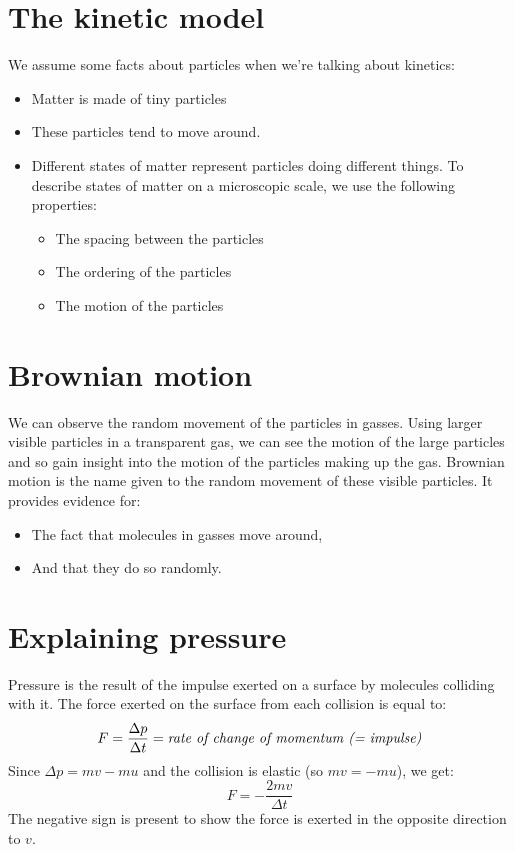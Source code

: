 \documentclass{article}
\begin{document}
\section*{The kinetic model}
\thispagestyle{empty}
We assume some facts about particles when we're talking about kinetics:
\begin{itemize}
	\item Matter is made of tiny particles
	\item These particles tend to move around.
	\item Different states of matter represent particles doing different things.
	To describe states of matter on a microscopic scale, we use the following
	properties:
		\begin{itemize}
			\item The spacing between the particles
			\item The ordering of the particles
			\item The motion of the particles
		\end{itemize}
\end{itemize}

\section*{Brownian motion}
We can observe the random movement of the particles in gasses. Using larger
visible particles in a transparent gas, we can see the motion of the large
particles and so gain insight into the motion of the particles making up the
gas. Brownian motion is the name given to the random movement of these visible
particles. It provides evidence for:
\begin{itemize}
	\item The fact that molecules in gasses move around,
	\item And that they do so randomly.
\end{itemize}

\section*{Explaining pressure}
Pressure is the result of the impulse exerted on a surface by molecules
colliding with it. The force exerted on the surface from each collision is
equal to:
\[
	F = \frac{
			\Delta p
		}{
			\Delta t
		} = \textrm{\textit{rate of change of momentum (= impulse)}}
\]
Since $\Delta p = mv - mu$ and the collision is elastic (so $mv = -mu$), we get:
\[
	F = -\frac{2mv}{\Delta t}
\]
The negative sign is present to show the force is exerted in the opposite 
direction to $v$.
\end{document}
